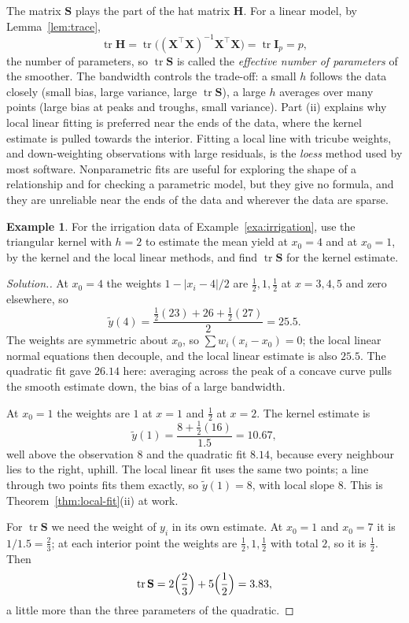 \documentclass[11pt,a4paper]{article}
\numberwithin{equation}{section}
\theoremstyle{definition}
\newtheorem{exa}[thm]{Example}
\newenvironment{solution}
  {\renewcommand{\qedsymbol}{}\begin{proof}[\textit{Solution}.]}
  {\end{proof}}
\begin{document}
The matrix $\mathbf{S}$ plays the part of the hat matrix $\mathbf{H}$. For a linear model, by
Lemma~\ref{lem:trace},
\[
\operatorname{tr}\mathbf{H} = \operatorname{tr}\bigl((\mathbf{X}^\top\mathbf{X})^{-1}\mathbf{X}^\top\mathbf{X}\bigr) = \operatorname{tr}\mathbf{I}_p = p ,
\]
the number of parameters, so $\operatorname{tr}\mathbf{S}$ is called the \emph{effective number of parameters} of the smoother. The
bandwidth controls the trade-off: a small $h$ follows the data closely (small bias, large variance, large
$\operatorname{tr}\mathbf{S}$), a large $h$ averages over many points (large bias at peaks and troughs, small variance). Part (ii)
explains why local linear fitting is preferred near the ends of the data, where the kernel estimate is
pulled towards the interior. Fitting a local line with tricube weights, and down-weighting
observations with large residuals, is the \emph{loess} method used by most software. Nonparametric fits are
useful for exploring the shape of a relationship and for checking a parametric model, but they give no
formula, and they are unreliable near the ends of the data and wherever the data are sparse.

\begin{exa}\label{exa:irrigation-kernel}
For the irrigation data of Example~\ref{exa:irrigation}, use the triangular kernel with $h = 2$ to estimate the
mean yield at $x_0 = 4$ and at $x_0 = 1$, by the kernel and the local linear methods, and find
$\operatorname{tr}\mathbf{S}$ for the kernel estimate.
\end{exa}

\begin{solution}
At $x_0 = 4$ the weights $1 - |x_i - 4|/2$ are $\frac12, 1, \frac12$ at $x = 3, 4, 5$ and zero elsewhere, so
\[
\tilde y(4) = \frac{\frac12(23) + 26 + \frac12(27)}{2} = 25.5 .
\]
The weights are symmetric about $x_0$, so $\sum w_i(x_i - x_0) = 0$; the local linear normal equations then decouple, and
the local linear estimate is also $25.5$. The quadratic fit gave $26.14$ here: averaging across the peak of a concave curve
pulls the smooth estimate down, the bias of a large bandwidth.

At $x_0 = 1$ the weights are $1$ at $x = 1$ and $\frac12$ at $x = 2$. The kernel estimate is
\[
\tilde y(1) = \frac{8 + \frac12(16)}{1.5} = 10.67 ,
\]
well above the observation $8$ and the quadratic fit $8.14$, because every neighbour lies to the right, uphill. The local
linear fit uses the same two points; a line through two points fits them exactly, so $\tilde y(1) = 8$, with local
slope $8$. This is Theorem~\ref{thm:local-fit}(ii) at work.

For $\operatorname{tr}\mathbf{S}$ we need the weight of $y_i$ in its own estimate. At $x_0 = 1$ and $x_0 = 7$ it is $1/1.5 = \frac23$; at each
interior point the weights are $\frac12, 1, \frac12$ with total $2$, so it is $\frac12$. Then
\[
\operatorname{tr}\mathbf{S} = 2\Bigl(\frac23\Bigr) + 5\Bigl(\frac12\Bigr) = 3.83 ,
\]
a little more than the three parameters of the quadratic.
\end{solution}
\end{document}
